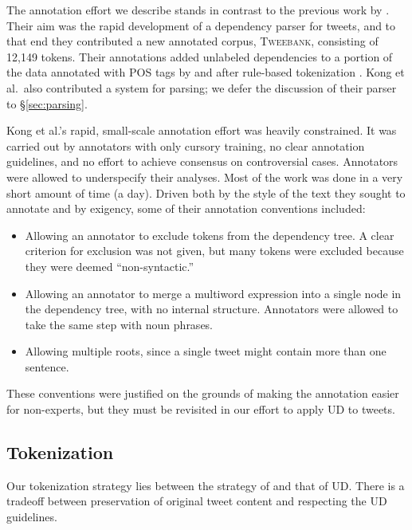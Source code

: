 \documentclass[11pt,a4paper]{article}
\newcommand{\yicomment}[1]{\textcolor{gray}{[#1 ---\textsc{yi}]}}
\begin{document}
The annotation effort we describe stands in contrast to the previous work
by .  Their aim was the rapid
development of a dependency parser for tweets, and to that end they
contributed a new annotated corpus, \textsc{Tweebank}, consisting of
12,149 tokens.  Their annotations added unlabeled dependencies to a portion of the data
annotated with POS tags by 
 and
 after rule-based tokenization \citep{ICWSM101540}.
Kong et al.~also contributed a system for parsing;
we defer the discussion of their parser to \S\ref{sec:parsing}.

Kong et al.'s rapid, small-scale annotation effort was heavily constrained.  It was
carried out by annotators with only cursory training, no clear
annotation guidelines, and no effort to achieve consensus on controversial
cases. Annotators were allowed to underspecify their analyses.
Most of the work was done in a very short amount of
time (a day).  Driven both by the style of the text they sought to annotate
and by exigency, some of their annotation conventions included:
\begin{itemize}
\item Allowing an annotator to exclude tokens from the dependency
  tree.  A clear criterion for exclusion was not given, but many
  tokens were excluded because they were deemed ``non-syntactic.''%
\item Allowing an annotator to merge a multiword expression into a
  single node in the dependency tree, with no internal structure.
  Annotators were allowed to take the same step with noun phrases.
\item Allowing multiple roots, since a single tweet might contain more
  than one sentence.
\end{itemize}
These conventions were justified on the grounds of making the
annotation easier for non-experts, but they must be revisited in our
effort to apply UD to tweets.

\subsection{Tokenization}\label{sec:tok-anno}
Our tokenization strategy lies between the strategy of
\citet{ICWSM101540} and that of UD.
There is a tradeoff between preservation of original tweet content and respecting
the UD guidelines.
\end{document}
